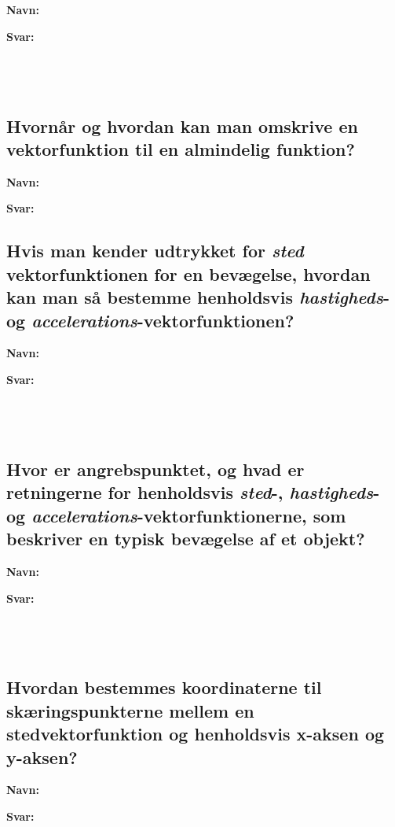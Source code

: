 \documentclass[a4paper, 12pt]{article}
\begin{document}
\textbf{Navn:}

\textbf{Svar:}

$$\phantom{a}$$

$$\phantom{a}$$

$$\phantom{a}$$

\subsection*{Hvornår og hvordan kan man omskrive en vektorfunktion til en almindelig funktion?}
\label{sec:org23d966d}

\textbf{Navn:}

\textbf{Svar:}

\newpage 

\subsection*{Hvis man kender udtrykket for \emph{sted}​vektorfunktionen for en bevægelse, hvordan kan man så bestemme henholdsvis \emph{hastigheds}​- og \emph{accelerations}​-vektorfunktionen?}
\label{sec:org128d126}

\textbf{Navn:}

\textbf{Svar:}

$$\phantom{a}$$

$$\phantom{a}$$

$$\phantom{a}$$

\subsection*{Hvor er angrebspunktet, og hvad er retningerne for henholdsvis \emph{sted}​-, \emph{hastigheds}​- og \emph{accelerations}​-vektorfunktionerne, som beskriver en typisk  bevægelse af et objekt?}
\label{sec:org83d3939}

\textbf{Navn:}

\textbf{Svar:}

$$\phantom{a}$$

$$\phantom{a}$$

$$\phantom{a}$$


\subsection*{Hvordan bestemmes koordinaterne til skæringspunkterne mellem en stedvektorfunktion og henholdsvis x-aksen og y-aksen?}
\label{sec:orgec69770}

\textbf{Navn:}

\textbf{Svar:}
\end{document}
